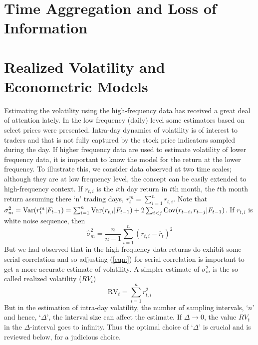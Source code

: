 \section{Time Aggregation and Loss of Information}


\section{Realized Volatility and Econometric Models}


Estimating the volatility using the high-frequency data has received a great deal of attention lately. In the low frequency (daily) level some estimators based on select prices were presented. Intra-day dynamics of volatility is of interest to traders and that is not fully captured by the stock price indicators sampled during the day. If higher frequency data are used to estimate volatility of lower frequency data, it is important to know the model for the return at the lower frequency. To illustrate this, we consider data observed at two time scales; although they are at low frequency level, the concept can be easily extended to high-frequency context. If $r_{t,i}$ is the $i$th day return in $t$th month, the $t$th month return assuming there `n' trading days, $r_t^m = \sum_{i=1}^nr_{t,i}$. Note that $\sigma_m^2 = \operatorname{Var}(r_t^m|F_{t-1}) = \sum_{i=1}^n \operatorname{Var}(r_{t,i} | F_{t-1}) + 2 \sum_{i<j} \operatorname{Cov}(r_{t-i},r_{t-j} | F_{t-1})$. If $r_{t,i}$ is white noise sequence, then
	\begin{equation}\label{Eqn:2hatsigmasq}
	\hat{\sigma}_m^2 = \frac{n}{n-1} \sum_{i=1}^n(r_{t,i} - \overline{r}_t)^2
	\end{equation}
But we had observed that in the high frequency data returns do exhibit some serial correlation and so adjusting (\ref{eqn:}) for serial correlation is important to get a more accurate estimate of volatility. A simpler estimate of $\sigma_m^2$ is the so called realized volatility ($RV_t$)
	\begin{equation}\label{eqn:2RV}
	\text{RV}_t = \sum_{i=1}^n r_{t,i}^2
	\end{equation}
But in the estimation of intra-day volatility, the number of sampling intervals, `$n$' and hence, `$\Delta$', the interval size can affect the estimate. If $\Delta \rightarrow 0$, the value $RV_t$ in the $\Delta$-interval goes to infinity. Thus the optimal choice of `$\Delta$' is crucial and is reviewed below, for a judicious choice.



